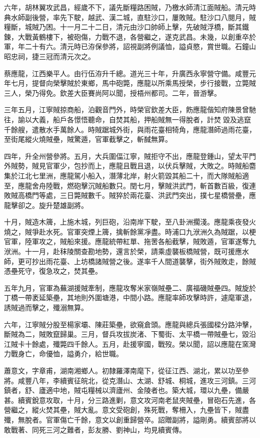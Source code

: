 \begin{pinyinscope}
六年，胡林翼攻武昌，經歲不下，議先斷糧路困賊，乃檄水師清江面賊船。清元時典水師副後營，率先下駛，越武、漢二城，直駐沙口，屢敗賊。駐沙口八閱月，賊糧斷，城賊乃困。十一月二十二日，清元由沙口帥師上擊，先破賊浮橋，斷其鐵鍊，大戰黃鶴樓下，被砲傷，力戰不退，各營繼之，遂克武昌。未幾，以創重卒於軍，年二十有六。清元時已洊保參將，詔視副將例議恤，謚貞愍，賞世職。石鐘山昭忠祠，捷三冠而清元次之。

蔡應龍，江西樂平人。由行伍洊升千總。道光三十年，升廣西永寧營守備。咸豐元年七月，提督向榮擊賊於東鄉，馬中砲斃，應龍以所乘馬授榮，步行接戰，立斃賊三人，榮乃得免。欽差大臣賽尚阿以聞，授梧州都司。二年，晉游擊。

三年五月，江寧賊掠商船，泊觀音門外，時榮官欽差大臣，飭應龍偕知府陳景曾馳往，諭以大義，船戶各憬悟聽命，自焚其船，押船賊無一得脫者，計焚毀及逃竄千餘艘，遣散水手萬餘人。時賊踞城外街，與雨花臺相犄角，應龍潛師過雨花臺，至街尾縱火燒賊壘，賊驚遁，官軍截擊之，斬馘無算。

四年，升全州營參將。五月，大兵圍偪江寧，賊拒守不出，應龍登鍾山，望太平門外賊勢，賊見官軍少，包抄而上，應龍且戰且退，以伏兵擊賊，大敗之。時賊船麕集於江北七里洲，應龍駕小船入，潛薄北岸，射火箭毀其船二十，而大隊賊船適至，應龍舍舟陸戰，燃砲擊沉賊船數只。閏七月，擊賊洪武門，斬首數百級，復連敗賊高橋門等處，三日斃賊數千。賊猝於兩花臺、洪武門突出，撲七星橋營壘，應龍擊卻之。旋升楚雄副將。

十月，賊造木簰，上施木城，列巨砲，沿南岸下駛，至八卦洲擱淺。應龍乘夜發火燒之，賊爭赴水死。官軍突煙上簰，擒斬餘黨凈盡。時浦口九洑洲久為賊踞，以梗官軍，陸軍攻之，賊船來援。應龍統帶紅單、拖罟各船截擊，賊敗遁，官軍遂奪九洑洲。十一月，赴秣陵關查勘地勢，還言於榮，請乘虛襲板橋賊營，既可援應水師，更可抄出雨花臺、上坊橋諸賊營之後。遂率千人間道襲擊，街外賊敗走，餘賊憑壘死守，復急攻之，焚其壘。

五年九月，官軍為蕪湖援賊牽制，應龍攻奪米家嶺賊壘二、廣福磯賊壘四。賊旋於丁橋一帶袤延築壘，其地則外圍塘港，中間小路。應龍率師攻擊時許，遽麾軍退，誘賊過而擊之，殲溺無算。

六年，江寧賊分股至楊家壩、陳莊築壘，欲窺倉頭。應龍與總兵張國樑分路沖擊，斷賊為二，賊敗竄歸巢。三月，督兵攻拔炭渚、下蜀街、太平橋一帶賊壘七，毀沿江賊卡十餘處，殲斃四千餘人。五月，赴援寧國，戰歿。榮以聞，詔以應龍在窯灣力戰身亡，命優恤，謚勇介，給世職。

蕭意文，字章甫，湖南湘鄉人。初隸羅澤南麾下，從征江西、湖北，累以功至參將。咸豐八年，李續賓征皖北，從克潛山、太湖、舒城、桐城，進攻三河鎮。三河鎮者，舒、廬適中地，賊屯糧械以濟廬州、金陵者也。築大城，環以九壘，備嚴甚。續賓銳意攻取，十月，分三路進剿，意文攻河南老鼠夾賊壘，冒砲石先進，各營繼之，縱火焚其壘，賊大亂。意文受砲創，殊死戰，奪柵入，九壘皆下，賊盡殲，無脫者。官軍傷亡千餘，意文以創重歸營卒。詔贈副將，謚剛勇。續賓部將以敢戰著、同死三河之難者，彭友勝、劉神山，均見續賓傳。


\end{pinyinscope}
